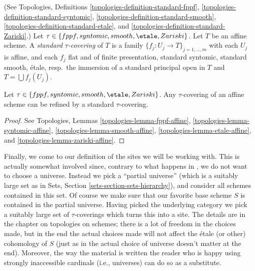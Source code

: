 \begin{definition}
\label{definition-standard-tau}
(See
Topologies, Definitions
\ref{topologies-definition-standard-fppf},
\ref{topologies-definition-standard-syntomic},
\ref{topologies-definition-standard-smooth},
\ref{topologies-definition-standard-etale}, and
\ref{topologies-definition-standard-Zariski}.)
Let $\tau \in \{fppf, syntomic, smooth, \etale, Zariski\}$.
Let $T$ be an affine scheme.
A {\it standard $\tau$-covering} of $T$ is a family
$\{f_j : U_j \to T\}_{j = 1, \ldots, m}$ with each $U_j$ is affine,
and each $f_j$ flat and of finite presentation,
standard syntomic, standard smooth, \'etale, resp.\ the immersion of a
standard principal open in $T$ and $T = \bigcup f_j(U_j)$.
\end{definition}

\begin{lemma}
\label{lemma-tau-affine}
Let $\tau \in \{fppf, syntomic, smooth, \etale, Zariski\}$.
Any $\tau$-covering of an affine scheme can be refined by a
standard $\tau$-covering.
\end{lemma}

\begin{proof}
See
Topologies, Lemmas
\ref{topologies-lemma-fppf-affine},
\ref{topologies-lemma-syntomic-affine},
\ref{topologies-lemma-smooth-affine},
\ref{topologies-lemma-etale-affine}, and
\ref{topologies-lemma-zariski-affine}.
\end{proof}

\noindent
Finally, we come to our definition of the sites we will be working with.
This is actually somewhat involved since, contrary to what happens in
\cite{SGA4}, we do not want to choose a universe. Instead we pick a ``partial
universe'' (which is a suitably large set as in
Sets, Section \ref{sets-section-sets-hierarchy}), and consider all schemes
contained in this set. Of course we make sure that our favorite base scheme
$S$ is contained in the partial universe. Having picked the underlying category
we pick a suitably large set of $\tau$-coverings which turns this into a site.
The details are in the chapter on topologies on schemes; there is a lot of
freedom in the choices made, but in the end the actual choices made will not
affect the \'etale (or other) cohomology of $S$ (just as in \cite{SGA4} the
actual choice of universe doesn't matter at the end). Moreover, the way the
material is written the reader who is happy using strongly inaccessible
cardinals (i.e., universes) can do so as a substitute.

